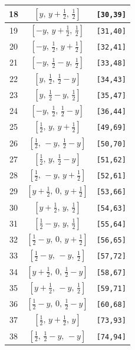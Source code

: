 \documentclass[fleqn,8pt]{jsarticle}
\begin{document}
\begin{longtable}{ccc}
18 & $\left[ y,\, y + \frac{1}{2},\, \frac{1}{2} \right]$ & {\tt [30,39]} \\ \hline
19 & $\left[ - y,\, y + \frac{1}{2},\, \frac{1}{2} \right]$ & {\tt [31,40]} \\ \hline
20 & $\left[ - y,\, \frac{1}{2},\, y + \frac{1}{2} \right]$ & {\tt [32,41]} \\ \hline
21 & $\left[ - y,\, \frac{1}{2} - y,\, \frac{1}{2} \right]$ & {\tt [33,48]} \\ \hline
22 & $\left[ y,\, \frac{1}{2},\, \frac{1}{2} - y \right]$ & {\tt [34,43]} \\ \hline
23 & $\left[ y,\, \frac{1}{2} - y,\, \frac{1}{2} \right]$ & {\tt [35,47]} \\ \hline
24 & $\left[ - y,\, \frac{1}{2},\, \frac{1}{2} - y \right]$ & {\tt [36,44]} \\ \hline
25 & $\left[ \frac{1}{2},\, y,\, y + \frac{1}{2} \right]$ & {\tt [49,69]} \\ \hline
26 & $\left[ \frac{1}{2},\, - y,\, \frac{1}{2} - y \right]$ & {\tt [50,70]} \\ \hline
27 & $\left[ \frac{1}{2},\, y,\, \frac{1}{2} - y \right]$ & {\tt [51,62]} \\ \hline
28 & $\left[ \frac{1}{2},\, - y,\, y + \frac{1}{2} \right]$ & {\tt [52,61]} \\ \hline
29 & $\left[ y + \frac{1}{2},\, 0,\, y + \frac{1}{2} \right]$ & {\tt [53,66]} \\ \hline
30 & $\left[ y + \frac{1}{2},\, y,\, \frac{1}{2} \right]$ & {\tt [54,63]} \\ \hline
31 & $\left[ \frac{1}{2} - y,\, y,\, \frac{1}{2} \right]$ & {\tt [55,64]} \\ \hline
32 & $\left[ \frac{1}{2} - y,\, 0,\, y + \frac{1}{2} \right]$ & {\tt [56,65]} \\ \hline
33 & $\left[ \frac{1}{2} - y,\, - y,\, \frac{1}{2} \right]$ & {\tt [57,72]} \\ \hline
34 & $\left[ y + \frac{1}{2},\, 0,\, \frac{1}{2} - y \right]$ & {\tt [58,67]} \\ \hline
35 & $\left[ y + \frac{1}{2},\, - y,\, \frac{1}{2} \right]$ & {\tt [59,71]} \\ \hline
36 & $\left[ \frac{1}{2} - y,\, 0,\, \frac{1}{2} - y \right]$ & {\tt [60,68]} \\ \hline
37 & $\left[ \frac{1}{2},\, y + \frac{1}{2},\, y \right]$ & {\tt [73,93]} \\ \hline
38 & $\left[ \frac{1}{2},\, \frac{1}{2} - y,\, - y \right]$ & {\tt [74,94]} \\ \hline

\end{longtable}
\end{document}
